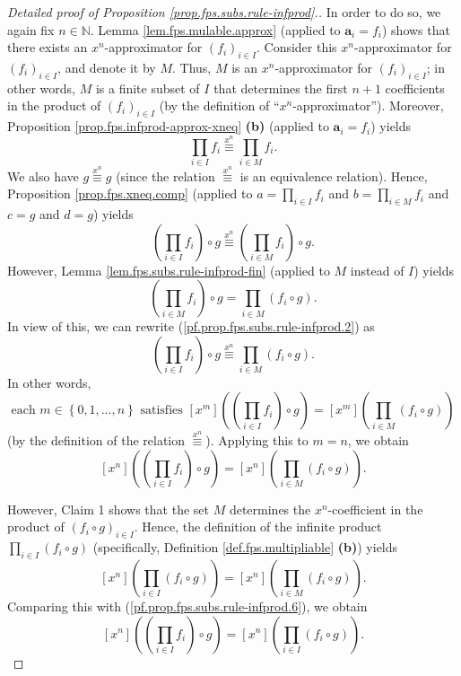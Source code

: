 \begin{proof}[Detailed proof of Proposition \ref{prop.fps.subs.rule-infprod}.]
In order to do so, we again fix $n\in\mathbb{N}$. Lemma
\ref{lem.fps.mulable.approx} (applied to $\mathbf{a}_{i}=f_{i}$) shows that
there exists an $x^{n}$-approximator for $\left(  f_{i}\right)  _{i\in I}$.
Consider this $x^{n}$-approximator for $\left(  f_{i}\right)  _{i\in I}$, and
denote it by $M$. Thus, $M$ is an $x^{n}$-approximator for $\left(
f_{i}\right)  _{i\in I}$; in other words, $M$ is a finite subset of $I$ that
determines the first $n+1$ coefficients in the product of $\left(
f_{i}\right)  _{i\in I}$ (by the definition of ``$x^{n}%
$-approximator''). Moreover, Proposition
\ref{prop.fps.infprod-approx-xneq} \textbf{(b)} (applied to $\mathbf{a}%
_{i}=f_{i}$) yields%
\begin{equation}
\prod_{i\in I}f_{i}\overset{x^{n}}{\equiv}\prod_{i\in M}f_{i}.
\label{pf.prop.fps.subs.rule-infprod.1}%
\end{equation}
We also have $g\overset{x^{n}}{\equiv}g$ (since the relation $\overset{x^{n}%
}{\equiv}$ is an equivalence relation). Hence, Proposition
\ref{prop.fps.xneq.comp} (applied to $a=\prod_{i\in I}f_{i}$ and
$b=\prod_{i\in M}f_{i}$ and $c=g$ and $d=g$) yields%
\begin{equation}
\left(  \prod_{i\in I}f_{i}\right)  \circ g\overset{x^{n}}{\equiv}\left(
\prod_{i\in M}f_{i}\right)  \circ g. \label{pf.prop.fps.subs.rule-infprod.2}%
\end{equation}
However, Lemma \ref{lem.fps.subs.rule-infprod-fin} (applied to $M$ instead of
$I$) yields%
\[
\left(  \prod_{i\in M}f_{i}\right)  \circ g=\prod_{i\in M}\left(  f_{i}\circ
g\right)  .
\]
In view of this, we can rewrite (\ref{pf.prop.fps.subs.rule-infprod.2}) as
\[
\left(  \prod_{i\in I}f_{i}\right)  \circ g\overset{x^{n}}{\equiv}\prod_{i\in
M}\left(  f_{i}\circ g\right)  .
\]
In other words,
\[
\text{each }m\in\left\{  0,1,\ldots,n\right\}  \text{ satisfies }\left[
x^{m}\right]  \left(  \left(  \prod_{i\in I}f_{i}\right)  \circ g\right)
=\left[  x^{m}\right]  \left(  \prod_{i\in M}\left(  f_{i}\circ g\right)
\right)
\]
(by the definition of the relation $\overset{x^{n}}{\equiv}$). Applying this
to $m=n$, we obtain%
\begin{equation}
\left[  x^{n}\right]  \left(  \left(  \prod_{i\in I}f_{i}\right)  \circ
g\right)  =\left[  x^{n}\right]  \left(  \prod_{i\in M}\left(  f_{i}\circ
g\right)  \right)  . \label{pf.prop.fps.subs.rule-infprod.6}%
\end{equation}

However, Claim 1 shows that the set $M$ determines the $x^{n}$-coefficient in
the product of $\left(  f_{i}\circ g\right)  _{i\in I}$. Hence, the definition
of the infinite product $\prod_{i\in I}\left(  f_{i}\circ g\right)  $
(specifically, Definition \ref{def.fps.multipliable} \textbf{(b)}) yields%
\[
\left[  x^{n}\right]  \left(  \prod_{i\in I}\left(  f_{i}\circ g\right)
\right)  =\left[  x^{n}\right]  \left(  \prod_{i\in M}\left(  f_{i}\circ
g\right)  \right)  .
\]
Comparing this with (\ref{pf.prop.fps.subs.rule-infprod.6}), we obtain%
\[
\left[  x^{n}\right]  \left(  \left(  \prod_{i\in I}f_{i}\right)  \circ
g\right)  =\left[  x^{n}\right]  \left(  \prod_{i\in I}\left(  f_{i}\circ
g\right)  \right)  .
\]


\end{proof}

